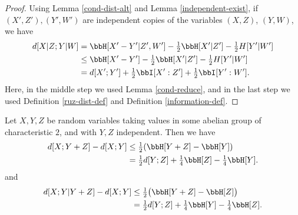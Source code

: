 \begin{proof}
\leanok
Using Lemma \ref{cond-dist-alt} and Lemma \ref{independent-exist}, if $(X',Z'), (Y',W')$ are independent copies of the variables $(X,Z)$, $(Y,W)$, we have
\begin{align*}
  d[X  | Z; Y | W]&= \bbH[X'-Y'|Z',W'] - \tfrac{1}{2} \bbH[X'|Z'] - \tfrac{1}{2}H[Y'|W'] \\
                       &\le \bbH[X'-Y']- \tfrac{1}{2} \bbH[X'|Z'] - \tfrac{1}{2}H[Y'|W'] \\
                       &= d[X';Y'] + \tfrac{1}{2}  \bbI[X' : Z'] + \tfrac{1}{2}  \bbI[Y' : W'].
\end{align*}
Here, in the middle step we used Lemma \ref{cond-reduce}, and in the last step we used Definition \ref{ruz-dist-def} and Definition \ref{information-def}.
\end{proof}

\begin{lemma}\label{first-useful}
  \leanok
  Let $X, Y, Z$ be random variables taking values in some abelian group of characteristic $2$, and with $Y, Z$ independent. Then we have
  \begin{align}\nonumber d[X; Y + Z] -d[X; Y] &  \leq \tfrac{1}{2} (\bbH[Y+Z] - \bbH[Y]) \\ & = \tfrac{1}{2} d[Y; Z] + \tfrac{1}{4} \bbH[Z] - \tfrac{1}{4} \bbH[Y]. \label{lem51-a} \end{align}
  and
  \begin{align}\nonumber
  d[X;Y|Y+Z] - d[X;Y] & \leq \tfrac{1}{2} \bigl(\bbH[Y+Z] - \bbH[Z]\bigr) \\ & = \tfrac{1}{2} d[Y;Z] + \tfrac{1}{4} \bbH[Y] - \tfrac{1}{4} \bbH[Z].
    \label{ruzsa-3}
  \end{align}
  \end{lemma}

